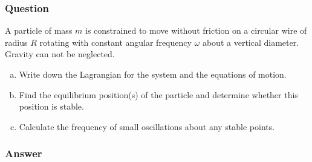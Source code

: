 \subsubsection{Question}

A particle of mass $m$ is constrained to move without friction on a circular
wire of radius $R$ rotating with constant angular frequency ${\omega}$ about a
vertical diameter. Gravity can not be neglected.
\begin{enumerate}[a)]
    \item
        Write down the Lagrangian for the system and the equations of motion.
    \item
        Find the equilibrium position(s) of the particle and determine
        whether this position is stable.
    \item
        Calculate the frequency of small oscillations about any stable points.
\end{enumerate}

\begin{figure}[H]
    \centering
\end{figure}

\subsubsection{Answer}

